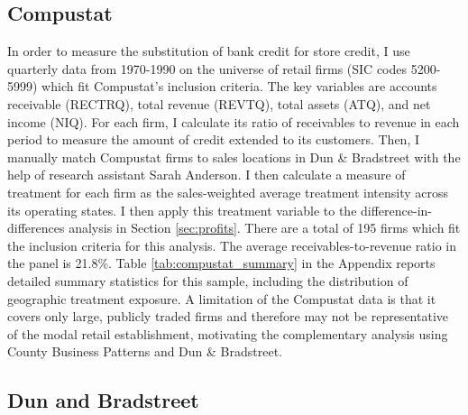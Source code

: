 \documentclass[12pt,english]{article}
\newif\ifblind
\begin{document}
\subsection{Compustat}\label{subsec:compustat}

In order to measure the substitution of bank credit for store credit, I use quarterly data from 1970-1990 on the universe of retail firms (SIC codes 5200-5999) which fit Compustat's inclusion criteria. The key variables are accounts receivable (RECTRQ), total revenue (REVTQ), total assets (ATQ), and net income (NIQ). For each firm, I calculate its ratio of receivables to revenue in each period to measure the amount of credit extended to its customers. Then, I manually match Compustat firms to sales locations in Dun \& Bradstreet with the help of \ifblind a research assistant\else research assistant Sarah Anderson\fi. I then calculate a measure of treatment for each firm as the sales-weighted average treatment intensity across its operating states. I then apply this treatment variable to the difference-in-differences analysis in Section \ref{sec:profits}. There are a total of 195 firms which fit the inclusion criteria for this analysis. The average receivables-to-revenue ratio in the panel is 21.8\%. Table \ref{tab:compustat_summary} in the Appendix reports detailed summary statistics for this sample, including the distribution of geographic treatment exposure. A limitation of the Compustat data is that it covers only large, publicly traded firms and therefore may not be representative of the modal retail establishment, motivating the complementary analysis using County Business Patterns and Dun \& Bradstreet.

\subsection{Dun and Bradstreet}
\end{document}

